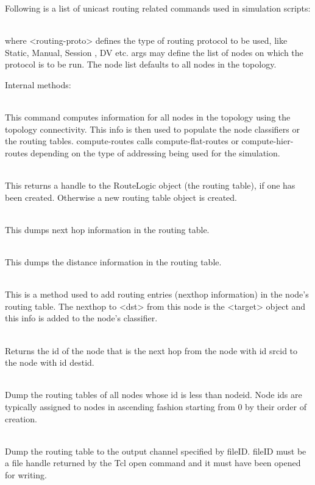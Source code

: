 Following is a list of unicast routing related commands used in simulation
scripts:
\begin{flushleft}
\\
where <routing-proto> defines the type of routing protocol to be used, like
Static, Manual, Session , DV etc. args may define the list of nodes on
which the protocol is to be run. The node list defaults to all nodes in
the topology.

Internal methods:

\\
This command computes  information for all nodes in the
topology using the topology connectivity. This  info is
then used to populate the node classifiers or the routing tables.
compute-routes calls compute-flat-routes or compute-hier-routes depending
on the type of addressing being used for the simulation.


\\
This returns a handle to the RouteLogic object (the routing table),
if one has been created. Otherwise a new routing table object is created.


\\
This dumps next hop information in the routing table.


\\
This dumps the distance information in the routing table.


\\
This is a method used to add routing entries (nexthop information) in the node's
routing table. The nexthop to <dst> from this node is the <target> object
and this info is added to the node's classifier.


\\
Returns the id of the node that is the next hop from the node with id
srcid to the node with id destid. 


\\
Dump the routing tables of all nodes whose id is less than nodeid. Node
ids are typically assigned to nodes in ascending fashion starting from 0
by their order of creation. 


\\
Dump the routing table to the output channel specified by fileID. fileID
must be a file handle returned by the Tcl open command and it must have
been opened for writing. 



\end{flushleft}
